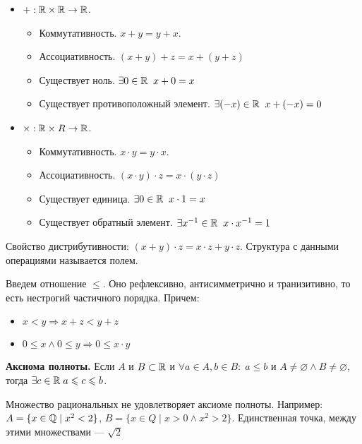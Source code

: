 \begin{itemize}
    \item $+: \mathbb{R} \times \mathbb{R} \to \mathbb{R}$.
        \begin{itemize}
            \item Коммутативность. $x+y=y+x$.
            \item Ассоциативность.  $(x+y)+z=x+(y+z)$
            \item Существует ноль.  $\exists 0 \in \mathbb{R} \; \; x + 0 = x$
            \item Существует противоположный элемент. $\exists (-x) \in \mathbb{R} \; \; x+(-x) = 0$
        \end{itemize}
    \item $\times: \mathbb{R} \times R \to \mathbb{R}$.
        \begin{itemize}
            \item Коммутативность. $x\cdot y=y\cdot x$.
            \item Ассоциативность.  $(x\cdot y)\cdot z=x\cdot (y\cdot z)$
            \item Существует единица.  $\exists 0 \in \mathbb{R} \; \; x \cdot 1 = x$
            \item Существует обратный элемент. $\exists x^{-1} \in \mathbb{R} \; \; x \cdot x^{-1} = 1$
        \end{itemize}
\end{itemize}
Свойство дистрибутивности: $(x+y) \cdot z = x \cdot z + y \cdot z$. Структура с данными операциями называется полем.

Введем отношение $\le$. Оно рефлексивно, антисимметрично и транизитивно, то есть нестрогий частичного порядка. Причем:
\begin{itemize}
    \item $x< y \Rightarrow x+z < y+z$
    \item  $0 \le x \land 0 \le y \Rightarrow 0 \le x\cdot y$
\end{itemize}
\textbf{Аксиома полноты.} Если $A$ и $B \subset \mathbb{R}$ и $\forall a \in A, b \in B: \; a \le b$ и $A \neq \varnothing \land B \neq \varnothing$, тогда $\exists c \in \mathbb{R}\; a \leqslant c \leqslant b$.
\begin{remark}
    Множество рациональных не удовлетворяет аксиоме полноты. Например: $A = \{x \in \mathbb{Q} \; \vert \; x^2 < 2\}$,  $B = \{x \in Q \; \vert \; x>0 \land x^2 > 2\}$. Единственная точка, между этими множествами --- $\sqrt{2}$ 
\end{remark}

